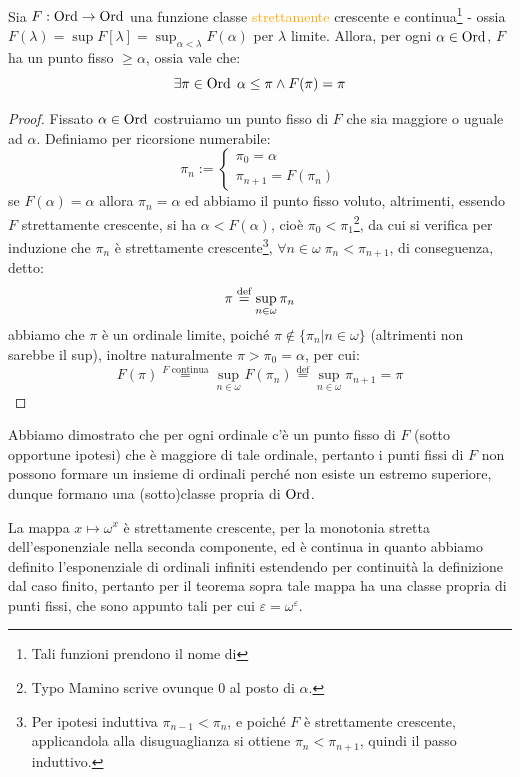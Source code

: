 \begin{proposition}
	Sia $F : \operatorname{Ord} \rightarrow \operatorname{Ord}$ una funzione classe \textcolor{orange}{strettamente} crescente e continua\footnote{Tali funzioni prendono il nome di } - ossia $F(\lambda) = \sup F[\lambda] = \sup_{\alpha < \lambda} F(\alpha)$ per $\lambda$ limite.
	Allora, per ogni $\alpha \in \operatorname{Ord}$, $F$ ha un punto fisso $\geq \alpha$, ossia vale che:
	\[ \exists \pi \in \operatorname{Ord} \; \alpha \leq \pi \land F(\pi) = \pi
		\]
\end{proposition}

\begin{proof}
	Fissato $\alpha \in \operatorname{Ord}$ costruiamo un punto fisso di $F$ che sia maggiore o uguale ad $\alpha$. Definiamo per ricorsione numerabile:
	\[ \pi_n := \begin{cases}
		\pi_0 = \alpha \\
		\pi_{n+1} = F(\pi_n)
	\end{cases}
		\]
	se $F(\alpha) = \alpha$ allora $\pi_n = \alpha$ ed abbiamo il punto fisso voluto, altrimenti, essendo $F$ strettamente crescente, si ha $\alpha < F(\alpha)$, cioè $\pi_0 < \pi_1$\footnote{Typo Mamino scrive ovunque 0 al posto di $\alpha$.}, da cui si verifica per induzione che $\pi_n$ è
	strettamente crescente\footnote{Per ipotesi induttiva $\pi_{n-1} < \pi_n$, e poiché $F$ è strettamente crescente, applicandola alla disuguaglianza si ottiene $\pi_n < \pi_{n+1}$, quindi il passo induttivo.}, $\forall n \in \omega \; \pi_n < \pi_{n+1}$, di conseguenza, detto:
	\[ \pi \overset{\text{def}}{=} \sup_{n \in \omega} \pi_n
		\]
	abbiamo che $\pi$ è un ordinale limite, poiché $\pi \not \in \{\pi_n | n \in \omega\}$ (altrimenti non sarebbe il sup), inoltre naturalmente $\pi > \pi_0 = \alpha$, per cui:
	\[ F(\pi) \overset{\text{$F$ continua}}{=} \sup_{n \in \omega} F(\pi_n) \overset{\text{def}}{=} \sup_{n \in \omega} \pi_{n+1} = \pi
		\]
\end{proof}

\begin{remark}
	Abbiamo dimostrato che per ogni ordinale c'è un punto fisso di $F$ (sotto opportune ipotesi) che è maggiore di tale ordinale, pertanto i punti fissi di $F$ non possono formare un insieme di ordinali perché non esiste un estremo superiore,
	dunque formano una (sotto)classe propria di $\operatorname{Ord}$.
\end{remark}

\begin{example}
	La mappa $x \mapsto \omega^x$ è strettamente crescente, per la monotonia stretta dell'esponenziale nella seconda componente, ed è continua in quanto abbiamo definito l'esponenziale di ordinali infiniti estendendo per continuità la definizione dal caso finito,
	pertanto per il teorema sopra tale mappa ha una classe propria di punti fissi, che sono appunto tali per cui $\varepsilon = \omega^{\varepsilon}$.
\end{example}

